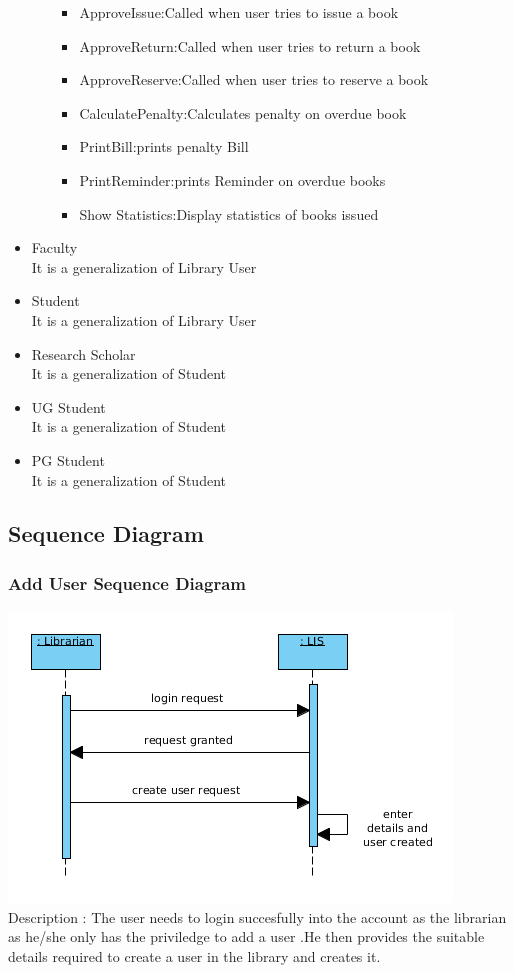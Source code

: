 \documentclass[a4paper]{article}
\begin{document}
\begin{itemize}
\begin{itemize}
\begin{itemize}
\item ApproveIssue:Called when user tries to issue a book
\item ApproveReturn:Called when user tries to return a book

\item ApproveReserve:Called when user tries to reserve a book
\item CalculatePenalty:Calculates penalty on overdue book
\item PrintBill:prints penalty Bill
\item PrintReminder:prints Reminder on overdue books
\item Show Statistics:Display statistics of books issued

\end{itemize}
\end{itemize}

\item Faculty\\
It is a generalization of Library User
\item Student\\
It is a generalization of Library User
\item Research Scholar\\
It is a generalization of Student
\item UG Student\\
It is a generalization of Student
\item PG Student\\
It is a generalization of Student

\end{itemize}
\subsection{Sequence Diagram}
\subsubsection*{Add User Sequence Diagram}
\includegraphics[scale=0.50]{images/seqDiagAddUser.png}
\\
Description : The user needs to login succesfully into the account as the librarian as he/she only has the priviledge to add a user .He then provides the suitable details required to create a user in the library and creates it.
\\
\end{document}
